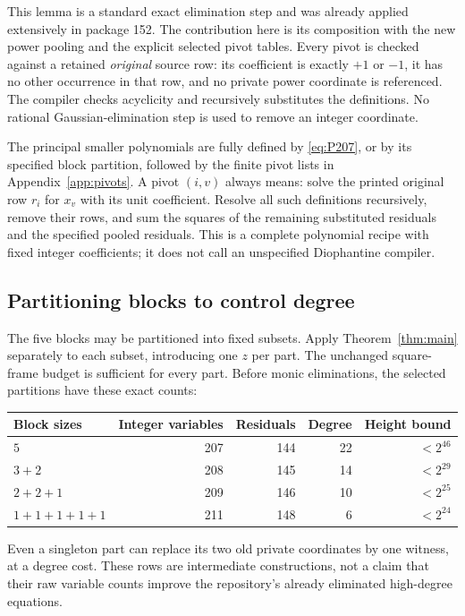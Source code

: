 \documentclass[10pt,letterpaper]{article}
\theoremstyle{remark}\newtheorem{remark}[theorem]{Remark}
\begin{document}
This lemma is a standard exact elimination step and was already applied
extensively in package 152. The contribution here is its composition with
the new power pooling and the explicit selected pivot tables. Every
pivot is checked against a retained \emph{original} source row: its
coefficient is exactly $+1$ or $-1$, it has no other occurrence in that
row, and no private power coordinate is referenced. The compiler checks
acyclicity and recursively substitutes the definitions. No rational
Gaussian-elimination step is used to remove an integer coordinate.

The principal smaller polynomials are fully defined by
\eqref{eq:P207}, or by its specified block partition, followed by the
finite pivot lists in Appendix~\ref{app:pivots}. A pivot $(i,v)$ always
means: solve the printed original row $r_i$ for $x_v$ with its unit
coefficient. Resolve all such definitions recursively, remove their
rows, and sum the squares of the remaining substituted residuals and
the specified pooled residuals. This is a complete polynomial recipe
with fixed integer coefficients; it does not call an unspecified
Diophantine compiler.

\subsection{Partitioning blocks to control degree}

The five blocks may be partitioned into fixed subsets. Apply
Theorem~\ref{thm:main} separately to each subset, introducing one $z$
per part. The unchanged square-frame budget is sufficient for every
part. Before monic eliminations, the selected partitions have these
exact counts:
\begin{center}
\begin{tabular}{lrrrr}
\toprule
Block sizes & Integer variables & Residuals & Degree & Height bound\\
\midrule
$5$ &207&144&22&$<2^{46}$\\
$3+2$ &208&145&14&$<2^{29}$\\
$2+2+1$ &209&146&10&$<2^{25}$\\
$1+1+1+1+1$ &211&148&6&$<2^{24}$\\
\bottomrule
\end{tabular}
\end{center}
Even a singleton part can replace its two old private coordinates by
one witness, at a degree cost. These rows are intermediate constructions,
not a claim that their raw variable counts improve the repository's
already eliminated high-degree equations.
\end{document}
